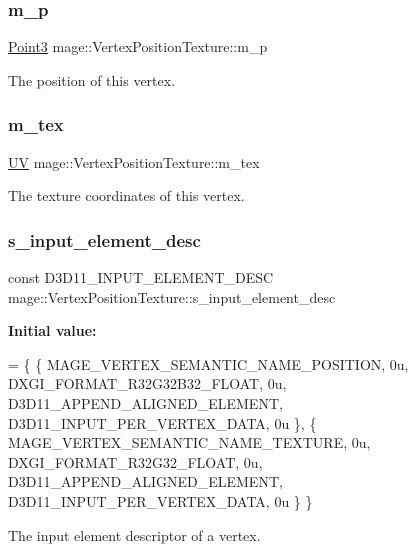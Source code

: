 \subsubsection{\texorpdfstring{m\+\_\+p}{m\_p}}
{\footnotesize\ttfamily \hyperlink{structmage_1_1_point3}{Point3} mage\+::\+Vertex\+Position\+Texture\+::m\+\_\+p}

The position of this vertex. \hypertarget{structmage_1_1_vertex_position_texture_af742cea48363bd9a1574d36a2cf5b2c6}{}\label{structmage_1_1_vertex_position_texture_af742cea48363bd9a1574d36a2cf5b2c6} 
\subsubsection{\texorpdfstring{m\+\_\+tex}{m\_tex}}
{\footnotesize\ttfamily \hyperlink{structmage_1_1_u_v}{UV} mage\+::\+Vertex\+Position\+Texture\+::m\+\_\+tex}

The texture coordinates of this vertex. \hypertarget{structmage_1_1_vertex_position_texture_a80b0fac785de688b33c155ea212c2cf3}{}\label{structmage_1_1_vertex_position_texture_a80b0fac785de688b33c155ea212c2cf3} 
\subsubsection{\texorpdfstring{s\+\_\+input\+\_\+element\+\_\+desc}{s\_input\_element\_desc}}
{\footnotesize\ttfamily const D3\+D11\+\_\+\+I\+N\+P\+U\+T\+\_\+\+E\+L\+E\+M\+E\+N\+T\+\_\+\+D\+E\+SC mage\+::\+Vertex\+Position\+Texture\+::s\+\_\+input\+\_\+element\+\_\+desc\hspace{0.3cm}{\ttfamily [static]}}

{\bfseries Initial value\+:}
\begin{DoxyCode}
= \{
        \{ MAGE\_VERTEX\_SEMANTIC\_NAME\_POSITION, 0u, DXGI\_FORMAT\_R32G32B32\_FLOAT,    0u, 
      D3D11\_APPEND\_ALIGNED\_ELEMENT, D3D11\_INPUT\_PER\_VERTEX\_DATA, 0u \},
        \{ MAGE\_VERTEX\_SEMANTIC\_NAME\_TEXTURE,  0u, DXGI\_FORMAT\_R32G32\_FLOAT,       0u, 
      D3D11\_APPEND\_ALIGNED\_ELEMENT, D3D11\_INPUT\_PER\_VERTEX\_DATA, 0u \}
    \}
\end{DoxyCode}
The input element descriptor of a vertex. \hypertarget{structmage_1_1_vertex_position_texture_a185dc518d4f2f23d69916978f71355e2}{}\label{structmage_1_1_vertex_position_texture_a185dc518d4f2f23d69916978f71355e2} 
